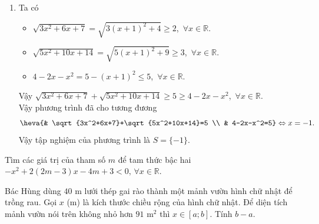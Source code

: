 \begin{bt}
{\begin{enumerate}
\begin{eqnarray*}
&\Rightarrow & 2x^2-9x-4=x^2-3x-4\\
&\Leftrightarrow & x^2-6x=0\Leftrightarrow \hoac{& x=0 \\ & x=6.}
\end{eqnarray*}
Thay các nghiệm $x=0$, $x=6$ vào phương trình ban đầu ta thấy chỉ có nghiệm $x=6$ thỏa mãn.\\
Vậy tập nghiệm của phương trình là $S=\{6\}$.
\item Ta có 
\begin{itemize}
	\item $\sqrt{3x^2+6x+7}=\sqrt{3(x+1)^2+4}\ge 2$,\ $\forall x\in\mathbb{R}$.
	\item $\sqrt{5x^2+10x+14}=\sqrt{5(x+1)^2+9}\ge 3$,\ $\forall x\in\mathbb{R}$.
	\item $4-2x-x^2=5-(x+1)^2\le 5$,\ $\forall x\in\mathbb{R}$.
\end{itemize}
Vậy $\sqrt{3x^2+6x+7}+\sqrt{5x^2+10x+14}\ge 5\ge 4-2x-x^2$,\ $\forall x\in\mathbb{R}$.\\
Vậy phương trình đã cho tương đương $$\heva{& \sqrt{3x^2+6x+7}+\sqrt{5x^2+10x+14}=5 \\ & 4-2x-x^2=5}\Leftrightarrow x=-1.$$
Vậy tập nghiệm của phương trình là $S=\{-1\}$.
\end{enumerate}
}
\end{bt}

\begin{bt}%
	Tìm các giá trị của tham số $m$ để tam thức bậc hai $-x^2+2\left(2m-3\right)x-4m+3<0 ,\,\forall x \in \mathbb{R}$.
\end{bt}

\begin{bt}%
	Bác Hùng dùng $40$ m lưới thép gai rào thành một mảnh vườn hình chữ nhật để trồng rau. Gọi $x$  (m) là kích thước chiều rộng của hình chữ nhật. Để diện tích mảnh vườn nói trên không nhỏ hơn $91$ m$^2$ thì $x\in [a;b]$. Tính $b-a$.
\end{bt}

